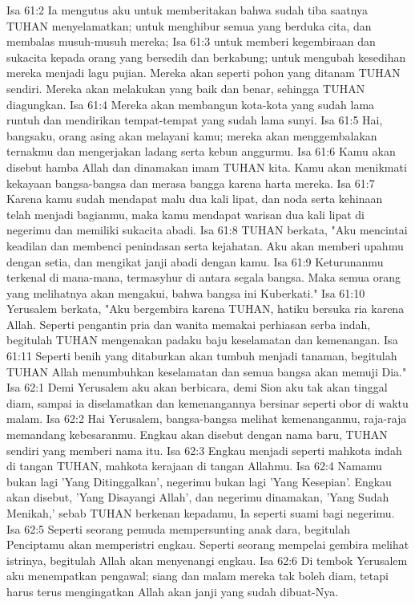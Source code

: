 Isa 61:2  Ia mengutus aku untuk memberitakan bahwa sudah tiba saatnya TUHAN menyelamatkan; untuk menghibur semua yang berduka cita, dan membalas musuh-musuh mereka;
Isa 61:3  untuk memberi kegembiraan dan sukacita kepada orang yang bersedih dan berkabung; untuk mengubah kesedihan mereka menjadi lagu pujian. Mereka akan seperti pohon yang ditanam TUHAN sendiri. Mereka akan melakukan yang baik dan benar, sehingga TUHAN diagungkan.
Isa 61:4  Mereka akan membangun kota-kota yang sudah lama runtuh dan mendirikan tempat-tempat yang sudah lama sunyi.
Isa 61:5  Hai, bangsaku, orang asing akan melayani kamu; mereka akan menggembalakan ternakmu dan mengerjakan ladang serta kebun anggurmu.
Isa 61:6  Kamu akan disebut hamba Allah dan dinamakan imam TUHAN kita. Kamu akan menikmati kekayaan bangsa-bangsa dan merasa bangga karena harta mereka.
Isa 61:7  Karena kamu sudah mendapat malu dua kali lipat, dan noda serta kehinaan telah menjadi bagianmu, maka kamu mendapat warisan dua kali lipat di negerimu dan memiliki sukacita abadi.
Isa 61:8  TUHAN berkata, "Aku mencintai keadilan dan membenci penindasan serta kejahatan. Aku akan memberi upahmu dengan setia, dan mengikat janji abadi dengan kamu.
Isa 61:9  Keturunanmu terkenal di mana-mana, termasyhur di antara segala bangsa. Maka semua orang yang melihatnya akan mengakui, bahwa bangsa ini Kuberkati."
Isa 61:10  Yerusalem berkata, "Aku bergembira karena TUHAN, hatiku bersuka ria karena Allah. Seperti pengantin pria dan wanita memakai perhiasan serba indah, begitulah TUHAN mengenakan padaku baju keselamatan dan kemenangan.
Isa 61:11  Seperti benih yang ditaburkan akan tumbuh menjadi tanaman, begitulah TUHAN Allah menumbuhkan keselamatan dan semua bangsa akan memuji Dia."
Isa 62:1  Demi Yerusalem aku akan berbicara, demi Sion aku tak akan tinggal diam, sampai ia diselamatkan dan kemenangannya bersinar seperti obor di waktu malam.
Isa 62:2  Hai Yerusalem, bangsa-bangsa melihat kemenanganmu, raja-raja memandang kebesaranmu. Engkau akan disebut dengan nama baru, TUHAN sendiri yang memberi nama itu.
Isa 62:3  Engkau menjadi seperti mahkota indah di tangan TUHAN, mahkota kerajaan di tangan Allahmu.
Isa 62:4  Namamu bukan lagi 'Yang Ditinggalkan', negerimu bukan lagi 'Yang Kesepian'. Engkau akan disebut, 'Yang Disayangi Allah', dan negerimu dinamakan, 'Yang Sudah Menikah,' sebab TUHAN berkenan kepadamu, Ia seperti suami bagi negerimu.
Isa 62:5  Seperti seorang pemuda mempersunting anak dara, begitulah Penciptamu akan memperistri engkau. Seperti seorang mempelai gembira melihat istrinya, begitulah Allah akan menyenangi engkau.
Isa 62:6  Di tembok Yerusalem aku menempatkan pengawal; siang dan malam mereka tak boleh diam, tetapi harus terus mengingatkan Allah akan janji yang sudah dibuat-Nya.
